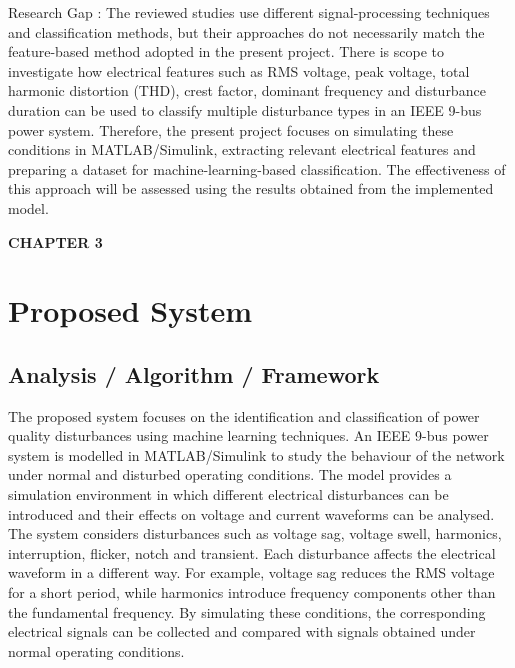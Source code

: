 \documentclass[12pt]{article}
\begin{document}
\begin{center}
Research Gap : The reviewed studies use different signal-processing techniques and classification methods, but their approaches do not necessarily match the feature-based method adopted in the present project. There is scope to investigate how electrical features such as RMS voltage, peak voltage, total harmonic distortion (THD), crest factor, dominant frequency and disturbance duration can be used to classify multiple disturbance types in an IEEE 9-bus power system. Therefore, the present project focuses on simulating these conditions in MATLAB/Simulink, extracting relevant electrical features and preparing a dataset for machine-learning-based classification. The effectiveness of this approach will be assessed using the results obtained from the implemented model.

 \clearpage

 
\begin{center}
    \vspace{2cm}
    
   \textbf{\LARGE CHAPTER 3}\\[2cm]
\end{center}


\section{  Proposed System }
 
\subsection{Analysis / Algorithm / Framework }
\vspace{0.5cm}

\justifying
The proposed system focuses on the identification and classification of power quality disturbances using machine learning techniques. An IEEE 9-bus power system is modelled in MATLAB/Simulink to study the behaviour of the network under normal and disturbed operating conditions. The model provides a simulation environment in which different electrical disturbances can be introduced and their effects on voltage and current waveforms can be analysed.\\

The system considers disturbances such as voltage sag, voltage swell, harmonics, interruption, flicker, notch and transient. Each disturbance affects the electrical waveform in a different way. For example, voltage sag reduces the RMS voltage for a short period, while harmonics introduce frequency components other than the fundamental frequency. By simulating these conditions, the corresponding electrical signals can be collected and compared with signals obtained under normal operating conditions.\\


\end{center}
\end{document}
